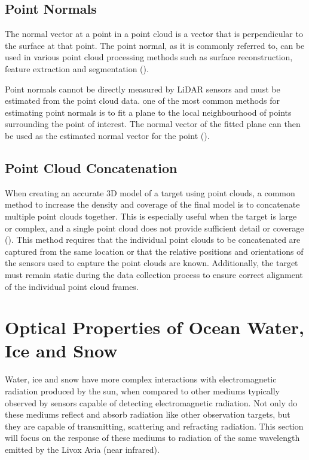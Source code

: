 \subsection{Point Normals}
\label{subsec:ch3.section3.subsec3}

The normal vector at a point in a point cloud is a vector that is perpendicular to the surface at that point. The point normal, as it is commonly referred to, can be used in various point cloud processing methods such as surface reconstruction, feature extraction and segmentation (\cite{harrapOverviewLIDARCollection2010}).

Point normals cannot be directly measured by \ac{LiDAR} sensors and must be estimated from the point cloud data. one of the most common methods for estimating point normals is to fit a plane to the local neighbourhood of points surrounding the point of interest. The normal vector of the fitted plane can then be used as the estimated normal vector for the point (\cite{bogoslavskyiFastRobustNormal2024}).

\subsection{Point Cloud Concatenation}
\label{subsec:ch3.section3.subsec4}

When creating an accurate 3D model of a target using point clouds, a common method to increase the density and coverage of the final model is to concatenate multiple point clouds together. This is especially useful when the target is large or complex, and a single point cloud does not provide sufficient detail or coverage (\cite{kedzierskiMethodsLaserScanning2015}). This method requires that the individual point clouds to be concatenated are captured from the same location or that the relative positions and orientations of the sensors used to capture the point clouds are known. Additionally, the target must remain static during the data collection process to ensure correct alignment of the individual point cloud frames.
 
\section{Optical Properties of Ocean Water, Ice and Snow}
\label{sec:ch3:section3}

Water, ice and snow have more complex interactions with electromagnetic radiation produced by the sun, when compared to other mediums typically observed by sensors capable of detecting electromagnetic radiation. Not only do these mediums reflect and absorb radiation like other observation targets, but they are capable of transmitting, scattering and refracting radiation. This section will focus on the response of these mediums to radiation of the same wavelength emitted by the Livox Avia (near infrared).

